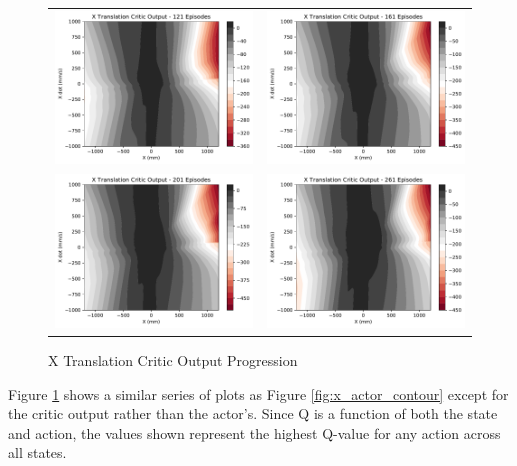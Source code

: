 \begin{figure}[H]
\begin{tabular}{cc}
		\includegraphics[width=65mm]{figures/train_figs/transx_critic/Critic1_121.pdf} &   \includegraphics[width=65mm]{figures/train_figs/transx_critic/Critic1_161.pdf} \\
		\includegraphics[width=65mm]{figures/train_figs/transx_critic/Critic1_201.pdf} &   \includegraphics[width=65mm]{figures/train_figs/transx_critic/Critic1_261.pdf} \\
	\end{tabular}
	\caption{X Translation Critic Output Progression}\label{fig:x_critic_contour}
\end{figure}
Figure \ref{fig:x_critic_contour} shows a similar series of plots as Figure \ref{fig:x_actor_contour} except for the critic output rather than the actor's. Since Q is a function of both the state and action, the values shown represent the highest Q-value for any action across all states.

